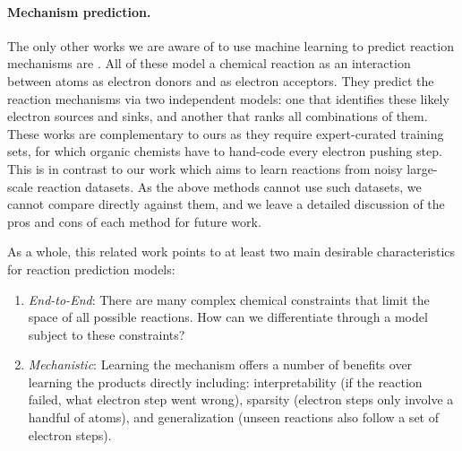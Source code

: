 \paragraph{Mechanism prediction.}
The only other works we are aware of to use machine learning to predict reaction mechanisms are \citet{fooshee2018deep,NIPS2011_4356,kayala2012reactionpredictor,kayala2011learning}. All of these model a chemical reaction as an interaction between atoms as electron donors and as electron acceptors. They predict the reaction mechanisms via two independent models: one that identifies these likely electron sources and sinks, and another that ranks all combinations of them.
These works are complementary to ours as they require expert-curated training sets, for which organic chemists have to hand-code every electron pushing step. %
This is in contrast to our work which aims to learn reactions from noisy large-scale reaction datasets. As the above methods cannot use such datasets, we cannot compare directly against them, and we leave a detailed discussion of the pros and cons of each method for future work.

As a whole, this related work points to at least two main desirable characteristics for reaction prediction models: 
\begin{enumerate}
\item \emph{End-to-End}: There are many complex chemical constraints that limit the space of all possible reactions. How can we differentiate through a model subject to these constraints?
\item \emph{Mechanistic}: Learning the mechanism offers a number of benefits over learning the products directly including: interpretability (if the reaction failed, what electron step went wrong), sparsity (electron steps only involve a handful of atoms), and generalization (unseen reactions also follow a set of electron steps).
\end{enumerate}

